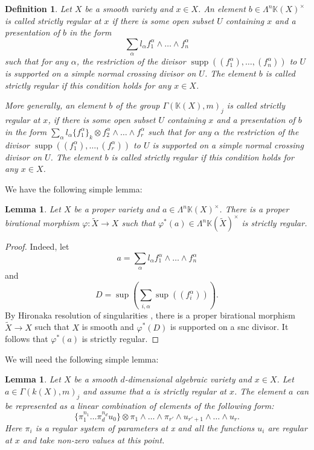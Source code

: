 \documentclass[12pt]{extarticle}
\newtheorem{lemma}[theorem]{Lemma}
\newtheorem{definition}[theorem]{Definition}
\def\mb{\mathbb}
\def\k{\mb K}
\def\wt{\widetilde}
\def\wdw{\wedge\dots\wedge}
\newcommand{\EP}[2]{{\Lambda^{#1}\k(#2)^\times}}
\DeclareMathOperator{\supp}{supp}
\begin{document}
\begin{definition}
\label{def:strictly_regular}
    Let $X$ be a smooth variety and $x\in X$. An element $b\in\EP{n}{X}$ is  called \emph{strictly regular at $x$} if there is some open subset $U$ containing $x$ and a presentation of $b$ in the form
    $$\sum_\alpha l_\alpha f_1^{\alpha}\wdw f_n^{\alpha}$$
    such that for any $\alpha$, the restriction of the divisor $\supp((f_1^\alpha),\dots, (f_n^\alpha))$ to $U$ is supported on a simple normal crossing divisor on $U$.  The element $b$ is called \emph{strictly regular} if this condition holds for any $x\in X$.

    More generally, an element $b$ of the group $\Gamma(\k(X),m)_j$ is called \emph{strictly regular} at $x$, if there is some open subset $U$ containing $x$ and a presentation of $b$ in the form $\sum_\alpha l_\alpha\{f_1^\alpha\}_k\otimes f_2^{\alpha}\wdw f_r^{\alpha}$ such that for any $\alpha$ the restriction of the  divisor $\supp((f_1^\alpha),\dots, (f_r^{\alpha}))$ to $U$ is supported on a simple normal crossing divisor on $U$. The element $b$ is called \emph{strictly regular} if this condition holds for any $x\in X$.

\end{definition}

We have the following simple lemma:

\begin{lemma}
\label{lemma:strictly_regular_blow_up}
    Let $X$ be a proper variety and $a\in \Lambda^n\k(X)^\times$. There is a proper birational morphism $\varphi\colon \wt X\to X$ such that $\varphi^*(a)\in \Lambda^n\k(\wt X)^\times$ is strictly regular.
\end{lemma}

\begin{proof}
    Indeed, let 
    $$a=\sum_{\alpha}l_\alpha f_1^\alpha\wdw f_n^\alpha$$
    and
    $$D=\sup\left(\sum_{i,\alpha}\sup((f_i^\alpha))\right).$$
    By Hironaka resolution of singularities \cite{hironaka_1}, there is a proper birational morphism $\wt X\to X$ such that $X$ is smooth and $\varphi^*(D)$ is supported on a snc divisor. It follows that $\varphi^*(a)$ is strictly regular.
\end{proof}

We will need the following simple lemma:

\begin{lemma}
\label{lemma:characterisation_of_strictly_regular_elements}
Let $X$ be a smooth $d$-dimensional algebraic variety and $x\in X$. Let $a\in\Gamma(k(X),m)_{j}$ and assume that $a$ is strictly regular at $x$. The element $a$ can be represented as a linear combination of elements of the following form:
    $$\{\pi_1^{n_1}\dots \pi_d^{n_d}u_0\}\otimes \pi_1\wdw \pi_{r'}\wedge u_{r'+1}\wdw u_r.$$
    Here $\pi_i$ is a regular system of parameters at x and all the functions $u_i$ are regular at $x$ and take non-zero values at this point.

\end{lemma}
\end{document}

